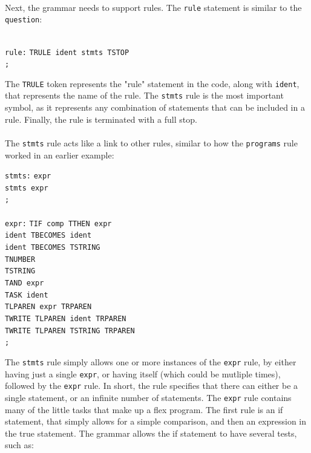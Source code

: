 \documentclass[12pt]{report}
\begin{document}
\\
Next, the grammar needs to support rules.  The \texttt{rule} statement is similar to the \texttt{question}:\\
\\
\begin{tabbing}
\texttt{rule:} \= \texttt{TRULE ident stmts TSTOP}\\
\> \texttt{;}\\
\end{tabbing}
The \texttt{TRULE} token represents the "rule" statement in the code, along with \texttt{ident}, that represents the name of the rule.  The \texttt{stmts} rule is the most important symbol, as it represents any combination of statements that can be included in a rule.  Finally, the rule is terminated with a full stop.\\
\\
The \texttt{stmts} rule acts like a link to other rules, similar to how the \texttt{programs} rule worked in an earlier example:\\
\begin{tabbing}
	\texttt{stmts:} \= \texttt{expr}\\
	\> \texttt{\textbar \space stmts expr}\\
	\> \texttt{;}\\
	\\
	\texttt{expr:} \= \texttt{TIF comp TTHEN expr}\\
	\> \texttt{\textbar \space ident TBECOMES ident}\\
	\> \texttt{\textbar \space ident TBECOMES TSTRING}\\
	\> \texttt{\textbar \space TNUMBER}\\
	\> \texttt{\textbar \space TSTRING}\\
	\> \texttt{\textbar \space TAND expr}\\
	\> \texttt{\textbar \space TASK ident}\\
	\> \texttt{\textbar \space TLPAREN expr TRPAREN}\\
	\> \texttt{\textbar \space TWRITE TLPAREN ident TRPAREN}\\
	\> \texttt{\textbar \space TWRITE TLPAREN TSTRING TRPAREN}\\
	\> \texttt{;}\\
\end{tabbing}
The \texttt{stmts} rule simply allows one or more instances of the \texttt{expr} rule, by either having just a single \texttt{expr}, or having itself (which could be mutliple times), followed by the \texttt{expr} rule.  In short, the rule specifies that there can either be a single statement, or an infinite number of statements.  The \texttt{expr} rule contains many of the little tasks that make up a flex program.  The first rule is an if statement, that simply allows for a simple comparison, and then an expression in the true statement.  The grammar allows the if statement to have several tests, such as:\\
\end{document}
